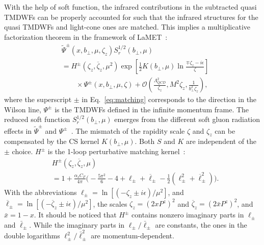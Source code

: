 With the help of soft function, the infrared contributions in the subtracted quasi TMDWFs can be properly accounted for such that the infrared structures for the   quasi TMDWFs and light-cone ones are matched. This implies a multiplicative factorization theorem in the framework of LaMET~\cite{Ebert:2019okf,Ji:2019sxk,Ji:2019ewn,Ji:2021znw,Ebert:2022fmh}:
\begin{align}
&\tilde \Psi^{\pm}(x, b_{\perp}, \mu, \zeta_z) S_r^{1/2}(b_{\perp}, \mu) \nonumber\\
&= H^{\pm}\left(\zeta_z, \overline\zeta_z, \mu^2\right) \exp\left[\frac{1}{2}K(b_{\perp},\mu)\ln\frac{\mp\zeta_z- i\epsilon}{\zeta} \right]  \nonumber\\
& \qquad\times \Psi^{\pm}(x, b_\perp, \mu, \zeta)+\mathcal{O}\left(\frac{\Lambda_{QCD}^2}{\zeta_z}, M^2\zeta_z,\frac{1}{b_{\perp}^2\zeta_z}\right),
\label{eq:matching}
\end{align}
where the superscript $\pm$ in Eq.~\eqref{eq:matching} corresponds to the direction in the Wilson line, $\Psi^{\pm}$ is the TMDWFs defined in the inﬁnite momentum frame. The reduced soft function $S^{1/2}_r(b_{\perp}, \mu)$ emerges from the different soft gluon radiation effects in $\tilde \Psi^{\pm}$ and $\Psi^{\pm}$~\cite{Ji:2021znw}. The mismatch  of the rapidity scale $\zeta$ and $\zeta_z$ can be compensated by the CS kernel $K(b_{\perp},\mu)$. Both $S$ and $K$ are independent of the $\pm$ choice.  $H^{\pm}$ is the 1-loop perturbative matching kernel~\cite{Ji:2021znw}:
\begin{align}
& H^{\pm}(\zeta_z, \overline{\zeta}_z,\mu) \nonumber\\
& = 1+  \frac{ \alpha_s C_F}{4\pi} \bigg(-\frac{5\pi^2}{6}-4 +{\ell}_{\pm} + \overline \ell_{\pm} - \frac{1}{2} ({\ell}_{\pm}^2 + \overline \ell_{\pm}^2) \bigg).  \label{eq:1loophardkernel}
\end{align}
With the abbreviations ${\ell}_{\pm} = \ln \left[(-\zeta_z \pm i\epsilon)/\mu^2\right]$, and $\overline {\ell}_{\pm} = \ln \left[(-\overline \zeta_z \pm i\epsilon)/\mu^2\right]$, the scales $\zeta_z = (2x P^z)^2$ and $\overline\zeta_z = \left(2\bar{x} P^z\right)^2$, and $\bar{x}=1-x$. It should be noticed that $H^{\pm}$ contains nonzero imaginary parts in $\ell_{\pm}$ and $\bar{\ell}_{\pm}$. While the imaginary parts in  $\ell_{\pm}/\bar{\ell}_{\pm}$ are constants, the  ones in the double logarithms ${\ell}_{\pm}^2/\bar{\ell}_{\pm}^2$ are momentum-dependent.

